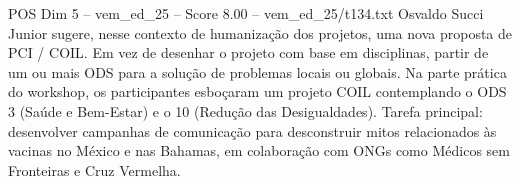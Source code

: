 \begin{textsample}{POS Dim 5 – vem\_ed\_25 – Score 8.00 – vem\_ed\_25/t134.txt}
Osvaldo Succi Junior sugere, nesse contexto de humanização dos projetos, uma nova proposta de PCI / COIL.
Em vez de desenhar o projeto com base em disciplinas, partir de um ou mais ODS para a solução de problemas locais ou globais.
Na parte prática do workshop, os participantes esboçaram um projeto COIL contemplando o ODS 3 (Saúde e Bem-Estar) e o 10 (Redução das Desigualdades).
Tarefa principal: desenvolver campanhas de comunicação para desconstruir mitos relacionados às vacinas no México e nas Bahamas, em colaboração com ONGs como Médicos sem Fronteiras e Cruz Vermelha.

\end{textsample}
